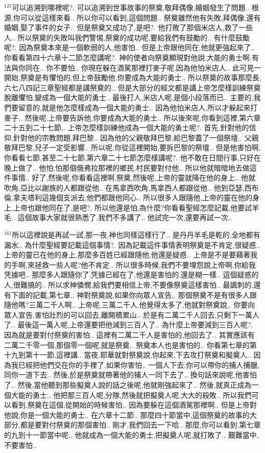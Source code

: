 \documentclass{book}
\begin{document}
$^{121}$可以追溯到哪裡呢?.
可以追溯到世事故事的祭奠,敬拜偶像,婚姻發生了問題..
根源,你可以從這樣來看..
所以你可以看到,這個問題..
祭奠雖然他有失敗,拜偶像,還有婚姻,娶了事件的女子..
但是祭奠又成功了,是吧?.
他打敗了那個米店人,救了一些人..
所以祭奠的失敗叫我們警惕,祭奠的成功呢,要給我們有鼓勵的..
有什麼鼓勵呢?.
因為祭奠本來是一個軟弱的人,他害怕..
但是上帝跟他同在,他就更強起來了..
你看看第四十六章十二節怎麼講呢?.
神的使者向祭奠顯現對他說,大能的勇士啊,有法與你同在..
你不要怕..
你現在躲在酒駕那裡打麥子呢,因為他怕米店人..
此可見一開始,祭奠是有懼怕的,但上帝鼓勵他,你要成為大能的勇士..
所以祭奠的故事那麼長,六七八四記三章聖經都是講祭奠的..
但是大部分的經文都是講上帝怎麼樣訓練祭奠脫離懼怕,變成為一個大能的勇士..
最後打人,米店人呢,是個小段落而已..
主要的,我們要留意的,就是他怎麼樣成為一個大能的勇士..
因為他怕米店人,所以才躲起來打麥子..
然後呢,上帝要告訴他,你要成為大能的勇士..
所以後來呢,你看到這裡,第六章二十五到二十七節,.
上帝怎麼樣訓練他成為一個大能的勇士呢?.
首先,針對他的信仰,針對他的宗教問題,拜巴黎..
因為他的父親敬拜巴黎,給巴黎蓋了一個祭壇..
父親敬拜巴黎,兒子一定受影響..
所以呢,你從這裡開始,要拆巴黎的祭壇..
但是他害怕啊,你看看七節,甚至二十七節,第六章二十七節怎麼樣講呢?.
他不敢在日間行事,只好在晚上做了..
他怕,怕那個俄弗拉那裡的鄉民,村民要對付他..
所以他就暗暗地去做這件事情..
好了,然後呢,你看看這裡啊,祭奠,然後呢,上帝的靈就降在他的身上..
他就吹角,亞比以謝族的人都跟從他..
在馬拿西吹角,馬拿西人都跟從他..
他到亞瑟,西布倫,拿夫塔利這幾個支派去,他們都跟他同心..
所以很多人跟隨他,上帝的靈在他的身上,上帝也跟他同在了,是吧?.
所以他還是怕,為什麼?你看看聖經怎麼記載,他要試羊毛..
這個故事大家就很熟悉了,我們不多講了..
他試完一次,還要再試一次..

$^{161}$所以這裡說是再試一試,那一夜,神也同樣這樣行了..
是丹丹羊毛是乾的,全地都有漏水..
為什麼聖經要記載這個事情?.
因為記載這件事情表明祭奠是不肯定,很疑惑..
上帝的靈已在他的身上,那麼多百姓已經跟隨他,他還是疑惑..
上帝是不是要藉著我的手啊,來拯救一些人呢?他不肯定..
所以很多時候,我們不要埋怨說上帝啊,你給我凭據吧..
那麼多人跟隨你了,凭據已經在了,他還是害怕的,還是糊一樣..
這個疑惑的人,很難搞的..
所以求神憐憫,給我們要相信上帝,不要像祭奠這樣害怕..
最諷刺的,還有下面的記載,第七章..
神對祭奠說,如果你向眾人宣告,.
那個祭奠不是有很多人跟隨他嗎?三萬二千人啊..
上帝呢,三萬二千人,他覺得太多了,他就對祭奠說,.
你要向眾人宣告,害怕壯烈的可以回去,離開積累山..
於是有二萬二千人回去,只剩下一萬人了..
最後這一萬人呢,上帝還要把他減到三百人了..
為什麼上帝要減到三百人呢?.
因為就是要對付祭奠的害怕..
這裡有二萬二千人是害怕的,他回去了..
其實應該有二萬二千零一個,那個零一個呢,就是祭奠..
祭奠本人也是害怕的..
你看第七章的第十九到第十一節,這裡講..
當夜,耶華就對祭奠說,你起來,下去攻打祭奠和擬奠人..
因為我已經把他們交在你的手裡了,如果你害怕,.
一個人下去,你可以帶你的捕人捕臘,同你一道下去..
然後,於是祭奠就帶著他的捕人一同下去了..
換句話來說呢,他害怕了..
然後,當他聽到那些擬奠人說的話之後呢,他就剛強起來了..
然後,就真正成為一個大能的勇士..
他把那三百人呢,分隊,然後就把擬奠人呢,大大的殺敗..
所以我們可以看到,祭奠在這個,從開始的時候害怕,.
因為要躲在這個酒駕那裡啊..
但是上帝對他說,你是一個大能的勇士..
在六章十二節..
那麼四十節當中,這個祭奠的故事的大部分,都是要對付祭奠的那個害怕..
剛才,我們回去一下哈..
那麼,你可以看到,第七章的九到十一節當中呢,.
他就成為一個大能的勇士,把擬奠人呢,就打敗了..
艱難當中,不要害怕..
\end{document}
